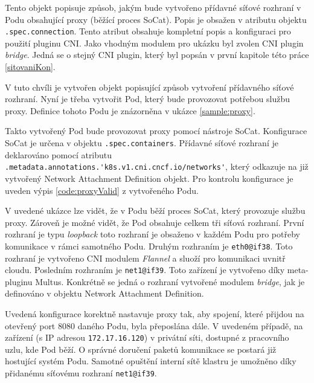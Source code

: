 

Tento objekt popisuje způsob, jakým bude vytvořeno přídavné síťové rozhraní v Podu obsahující proxy (běžící proces SoCat). Popis je obsažen v atributu objektu \verb|.spec.connection|. Tento atribut obsahuje kompletní popis a konfiguraci pro použití  pluginu CNI. Jako vhodným modulem pro ukázku byl zvolen CNI plugin \textit{bridge}. Jedná se o stejný CNI plugin, který byl popsán v první kapitole této práce \ref{sitovaniKon}.

V tuto chvíli je vytvořen objekt popisující způsob vytvoření přídavného síťové rozhraní. Nyní je třeba vytvořit Pod, který bude provozovat potřebou službu proxy. Definice tohoto Podu je znázorněna v ukázce \ref{sample:proxy}.



\newpage

Takto vytvořený Pod bude provozovat proxy pomocí nástroje SoCat. Konfigurace SoCat je určena v objektu \verb|.spec.containers|. Přídavné síťové rozhraní je deklarováno pomocí atributu \verb|.metadata.annotations.'k8s.v1.cni.cncf.io/networks'|, který odkazuje na již vytvořený Network Attachment Definition objekt. Pro kontrolu konfigurace je uveden výpis \ref{code:proxyValid} z vytvořeného Podu.



V uvedené ukázce lze vidět, že v Podu běží proces SoCat, který provozuje službu proxy. Zároveň je možné vidět, že Pod obsahuje celkem tři síťová rozhraní. První rozhraní je typu \textit{loopback} toto rozhraní je obsaženo v každém Podu pro potřeby komunikace v rámci samotného Podu. Druhým rozhraním je \verb|eth0@if38|. Toto rozhraní je vytvořeno CNI modulem \textit{Flannel} a sluoží pro komunikaci uvnitř cloudu. Posledním rozhraním je \verb|net1@if39|. Toto zařízení je vytvořeno díky meta-pluginu Multus. Konkrétně se jedná o  rozhraní vytvořené  modulem \textit{bridge}, jak je definováno v objektu Network Attachment Definition.

Uvedená konfigurace korektně nastavuje proxy tak, aby spojení, které přijdou na otevřený port 8080 daného Podu, byla přeposlána dále. V uvedeném případě, na zařízení (s IP adresou \verb|172.17.16.120|) v privátní síti, dostupné z pracovního uzlu, kde Pod běží. O správné doručení paketů komunikace se postará již hostující systém Podu. Samotné opuštění interní sítě klastru je umožněno díky přidanému síťovému rozhraní \verb|net1@if39|.

